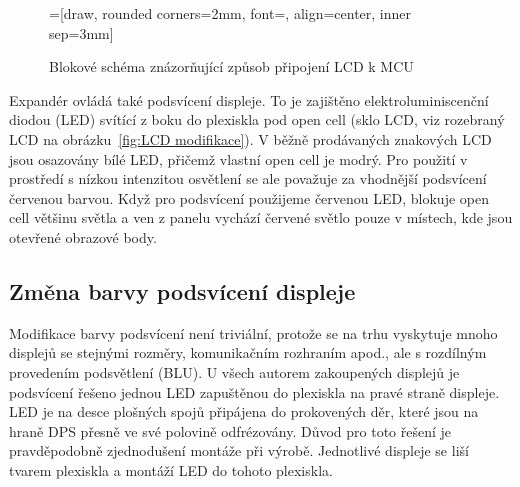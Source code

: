 \begin{figure}[htbp]
    \centering
    =[draw, rounded corners=2mm, font={\bfseries}, align=center, inner sep=3mm]
    \caption{Blokové schéma znázorňující způsob připojení LCD k MCU}
    \label{fig:LCD blok}
\end{figure}


Expandér ovládá také podsvícení displeje. To je zajištěno elektroluminiscenční
diodou (LED) svítící z boku do plexiskla pod open cell (sklo LCD, viz rozebraný
LCD na obrázku~\vref{fig:LCD modifikace}). V běžně prodávaných znakových LCD
jsou osazovány bílé LED, přičemž vlastní open cell je modrý. Pro použití
v prostředí s nízkou intenzitou osvětlení se ale považuje za vhodnější
podsvícení červenou barvou. Když pro
podsvícení použijeme červenou LED, blokuje open cell většinu světla a ven
z panelu vychází červené světlo pouze v místech, kde jsou otevřené obrazové
body.

\subsection{Změna barvy podsvícení displeje}
Modifikace barvy podsvícení není triviální, protože se na trhu vyskytuje mnoho
displejů se stejnými rozměry, komunikačním rozhraním apod., ale s rozdílným
provedením podsvětlení (\acs{BLU}). U všech autorem zakoupených displejů je
podsvícení řešeno jednou LED zapuštěnou do plexiskla na pravé straně displeje.
LED je na desce plošných spojů připájena do prokovených děr, které jsou na
hraně DPS přesně ve své polovině odfrézovány. Důvod pro toto řešení je
pravděpodobně zjednodušení montáže při výrobě. Jednotlivé displeje se liší
tvarem plexiskla a montáží LED do tohoto plexiskla.

